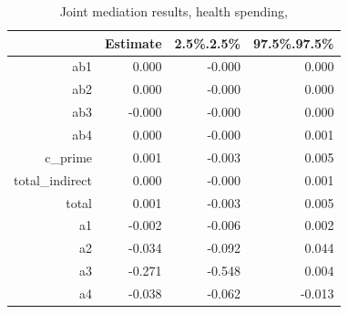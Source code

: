 \begin{table}[ht]
\centering
\begin{tabular}{rrrr}
  \hline
 & Estimate & 2.5\%.2.5\% & 97.5\%.97.5\% \\ 
  \hline
ab1 & 0.000 & -0.000 & 0.000 \\ 
  ab2 & 0.000 & -0.000 & 0.000 \\ 
  ab3 & -0.000 & -0.000 & 0.000 \\ 
  ab4 & 0.000 & -0.000 & 0.001 \\ 
  c\_prime & 0.001 & -0.003 & 0.005 \\ 
  total\_indirect & 0.000 & -0.000 & 0.001 \\ 
  total & 0.001 & -0.003 & 0.005 \\ 
  a1 & -0.002 & -0.006 & 0.002 \\ 
  a2 & -0.034 & -0.092 & 0.044 \\ 
  a3 & -0.271 & -0.548 & 0.004 \\ 
  a4 & -0.038 & -0.062 & -0.013 \\ 
   \hline
\end{tabular}
\caption{Joint mediation results, health spending,} 
\end{table}
